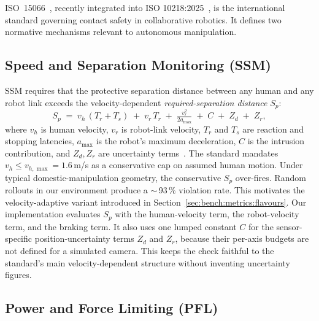 \documentclass[11pt,a4paper]{report}
\newcommand{\ssm}{SSM}
\newcommand{\pfl}{PFL}
\newcommand{\iso}{ISO~15066}
\begin{document}
\iso{}~\cite{iso15066}, recently integrated into ISO
10218:2025~\cite{iso10218,hartmann2026iso}, is the international standard governing
contact safety in collaborative robotics. It defines two normative
mechanisms relevant to autonomous manipulation.

\subsection{Speed and Separation Monitoring (\ssm{})}
\label{sec:bg:iso:ssm}

\ssm{} requires that the protective separation distance between any
human and any robot link exceeds the velocity-dependent
\emph{required-separation distance} $S_p$:
\begin{equation}
  S_p \;=\; v_h \,(T_r + T_s) \;+\; v_r \, T_r
     \;+\; \tfrac{v_r^2}{2 a_{\max}} \;+\; C \;+\; Z_d \;+\; Z_r,
  \label{eq:iso-ssm}
\end{equation}
where $v_h$ is human velocity, $v_r$ is robot-link velocity, $T_r$
and $T_s$ are reaction and stopping latencies, $a_{\max}$ is the
robot's maximum deceleration, $C$ is the intrusion contribution,
and $Z_d, Z_r$ are uncertainty
terms~\cite{iso15066,svarny2019unified}.
The standard mandates $v_h \le v_{h,\max} = 1.6$\,m/s as a
conservative cap on assumed human motion. Under typical
domestic-manipulation geometry, the conservative $S_p$ over-fires.
Random rollouts in our environment produce a $\sim$\,93\,\% violation
rate. This motivates the velocity-adaptive variant introduced in
Section~\ref{sec:bench:metrics:flavours}. Our implementation evaluates
$S_p$ with the human-velocity term, the robot-velocity term, and the
braking term. It also uses one lumped constant $C$ for the
sensor-specific position-uncertainty terms $Z_d$ and $Z_r$, because
their per-axis budgets are not defined for a simulated camera. This
keeps the check faithful to the standard's main velocity-dependent
structure without inventing uncertainty figures.

\subsection{Power and Force Limiting (\pfl{})}
\label{sec:bg:iso:pfl}
\end{document}
